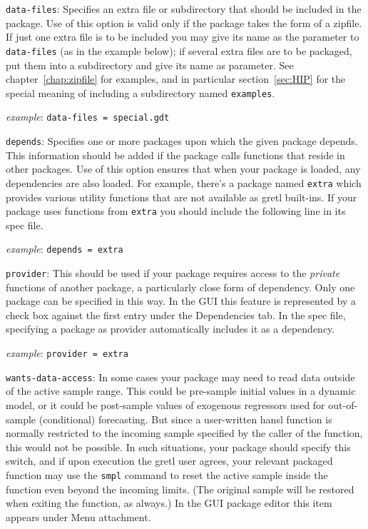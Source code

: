 \documentclass[oneside]{book}
\newcommand{\ttusage}[1]{\textit{example}: \quad \texttt{#1}}
\begin{document}
\begin{description}

\item \texttt{data-files}: Specifies an extra file or subdirectory
  that should be included in the package. Use of this option is valid
  only if the package takes the form of a zipfile. If just one extra
  file is to be included you may give its name as the parameter to
  \texttt{data-files} (as in the example below); if several extra
  files are to be packaged, put them into a subdirectory and give its
  name as parameter. See chapter~\ref{chap:zipfile} for examples, and
  in particular section~\ref{sec:HIP} for the special meaning of
  including a subdirectory named \texttt{examples}.

  \ttusage{data-files = special.gdt}

\item \texttt{depends}: Specifies one or more packages upon which the
  given package depends. This information should be added if the
  package calls functions that reside in other packages.  Use of this
  option ensures that when your package is loaded, any dependencies
  are also loaded.  For example, there's a package named
  \texttt{extra} which provides various utility functions that are not
  available as gretl built-ins.  If your package uses functions from
  \texttt{extra} you should include the following line in its spec
  file.

  \ttusage{depends = extra}

\item \texttt{provider}: This should be used if your package requires
  access to the \textit{private} functions of another package, a
  particularly close form of dependency. Only one package can be
  specified in this way.  In the GUI this feature is represented by a
  check box against the first entry under the \textsf{Dependencies}
  tab. In the spec file, specifying a package as provider
  automatically includes it as a dependency.

  \ttusage{provider = extra}

\item \texttt{wants-data-access}: In some cases your package may need
  to read data outside of the active sample range. This could be
  pre-sample initial values in a dynamic model, or it could be
  post-sample values of exogenous regressors used for out-of-sample
  (conditional) forecasting.  But since a user-written hansl function
  is normally restricted to the incoming sample specified by the
  caller of the function, this would not be possible. In such
  situations, your package should specify this switch, and if upon
  execution the gretl user agrees, your relevant packaged function may
  use the \texttt{smpl} command to reset the active sample inside the
  function even beyond the incoming limits. (The original sample will
  be restored when exiting the function, as always.) In the GUI
  package editor this item appears under \textsf{Menu attachment}.


\end{description}
\end{document}
